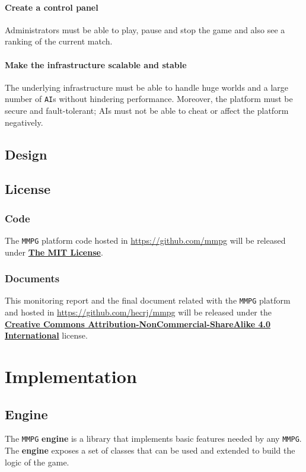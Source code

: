 \documentclass[a4paper,11pt,titlepage,abstract,numbers=noenddot,automark,mnsy,intlimits,rgb,dvipsnames]{report}
\begin{document}
\subsection{Create a control panel}
Administrators must be able to play, pause and stop the game and also see a ranking of the current match.
\subsection{Make the infrastructure scalable and stable}
The underlying infrastructure must be able to handle huge worlds and a large number of \texttt{AI}s without
hindering performance. Moreover, the platform must be secure and fault-tolerant; AIs must not be able to cheat
or affect the platform negatively.
\clearpage
\chapter{Design}
\clearpage
\chapter{License}
\section{Code}
The \texttt{MMPG} platform code hosted in \url{https://github.com/mmpg} will be released under
\href{https://opensource.org/licenses/MIT}{\textbf{The MIT License}}.
\section{Documents}
This monitoring report and the final document related with the \texttt{MMPG} platform and hosted in
\url{https://github.com/hecrj/mmpg} will be released under the
\href{http://creativecommons.org/licenses/by-nc-sa/4.0/legalcode.txt}{\textbf{Creative Commons Attribution-NonCommercial-ShareAlike 4.0 International}}
license.
\clearpage
\part{Implementation}
\chapter{Engine}
The \texttt{MMPG} \textbf{engine} is a library that implements basic features needed by any \texttt{MMPG}. The \textbf{engine} exposes a set
of classes that can be used and extended to build the logic of the game.
\end{document}
